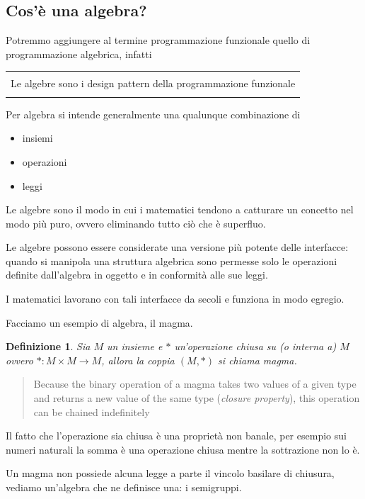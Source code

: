 \documentclass[12pt]{article}
\newtheorem{definition}{Definizione}
\newenvironment{demo}
    {\begin{center}
    \begin{tabular}{|p{0.9\textwidth}|}
    \hline\\
    }
    {
    \\\\\hline
    \end{tabular}
    \end{center}
    }
\begin{document}
\subsection{Cos'è una algebra?}

Potremmo aggiungere al termine programmazione funzionale quello di programmazione algebrica, infatti

\begin{demo}
Le algebre sono i design pattern della programmazione funzionale
\end{demo}

Per algebra si intende generalmente una qualunque combinazione di

\begin{itemize}
  \item insiemi
  \item operazioni
  \item leggi
\end{itemize}

Le algebre sono il modo in cui i matematici tendono a catturare un concetto nel modo più puro,
ovvero eliminando tutto ciò che è superfluo.

Le algebre possono essere considerate una versione più potente delle interfacce: quando si manipola una struttura algebrica
sono permesse solo le operazioni definite dall'algebra in oggetto e in conformità alle sue leggi.

I matematici lavorano con tali interfacce da secoli e funziona in modo egregio.

Facciamo un esempio di algebra, il magma.

\begin{definition}
Sia $M$ un insieme e $*$ un'operazione \emph{chiusa su} (o \emph{interna a}) $M$ ovvero $*: M \times M \rightarrow M$,
allora la coppia $(M, *)$ si chiama \emph{magma}.
\end{definition}

\begin{quote}
Because the binary operation of a magma takes two values of a given type and returns a new value of the same type (\emph{closure property}),
this operation can be chained indefinitely
\end{quote}

Il fatto che l'operazione sia chiusa è una proprietà non banale,
per esempio sui numeri naturali la somma è una operazione chiusa mentre la sottrazione non lo è.

Un magma non possiede alcuna legge a parte il vincolo basilare di chiusura, vediamo un'algebra che ne definisce una: i semigruppi.
\end{document}
